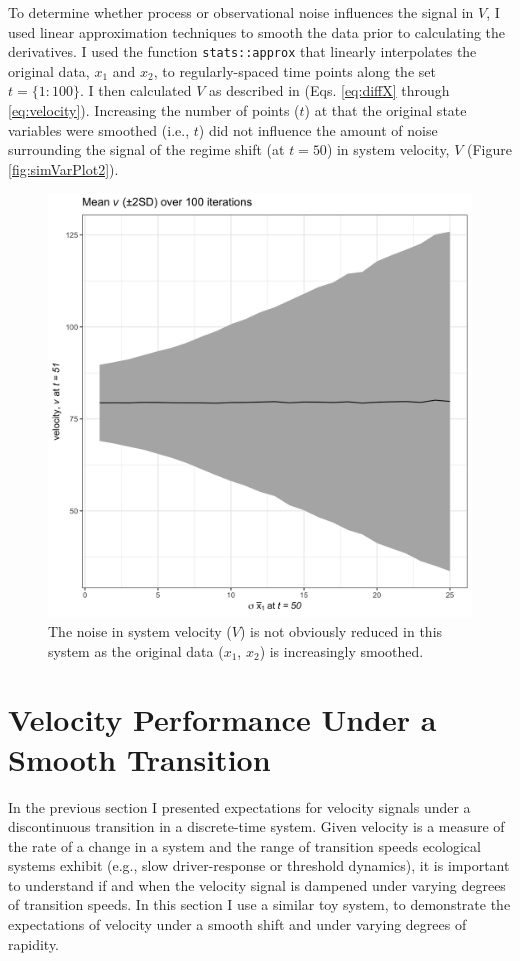 \documentclass[print]{nuthesis}
\begin{document}
To determine whether process or observational noise influences the signal in \(V\), I used linear approximation techniques to smooth the data prior to calculating the derivatives. I used the function \texttt{stats::approx} that linearly interpolates the original data, \(x_1\) and \(x_2\), to regularly-spaced time points along the set \(t=\{1:100\}\). I then calculated \(V\) as described in (Eqs. \eqref{eq:diffX} through \eqref{eq:velocity}). Increasing the number of points (\(t\)) at that the original state variables were smoothed (i.e., \(t\)) did not influence the amount of noise surrounding the signal of the regime shift (at \(t=50\)) in system velocity, \(V\) (Figure \ref{fig:simVarPlot2}).
\begin{figure}
\includegraphics[width=0.85\linewidth]{./chapterFiles/velocity/figsCalledInDiss/smoothV} \caption{The noise in system velocity ($V$) is not obviously reduced in this system as the original data ($x_1$, $x_2$) is increasingly smoothed.}\label{fig:smoothV}
\end{figure}
\hypertarget{velocity-performance-under-a-smooth-transition}{%
\section{Velocity Performance Under a Smooth Transition}\label{velocity-performance-under-a-smooth-transition}}

In the previous section I presented expectations for velocity signals under a discontinuous transition in a discrete-time system. Given velocity is a measure of the rate of a change in a system and the range of transition speeds ecological systems exhibit (e.g., slow driver-response or threshold dynamics), it is important to understand if and when the velocity signal is dampened under varying degrees of transition speeds. In this section I use a similar toy system, to demonstrate the expectations of velocity under a smooth shift and under varying degrees of rapidity.
\end{document}
